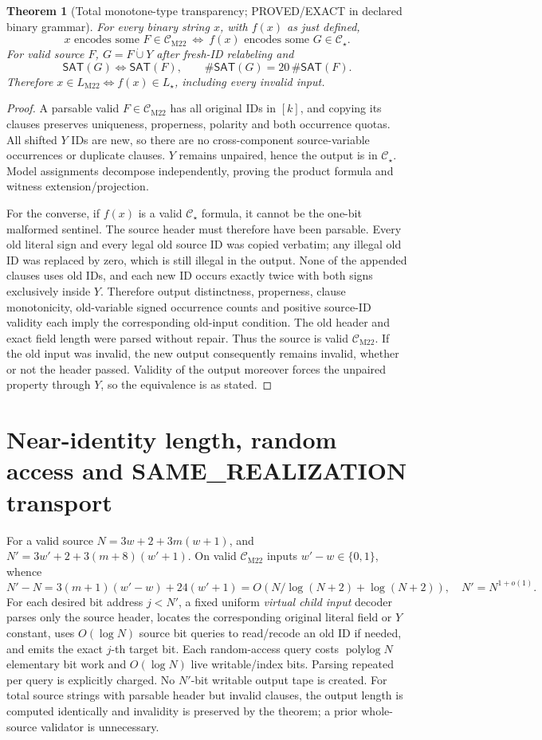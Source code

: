 \documentclass[11pt]{article}
\newtheorem{theorem}{Theorem}
\newcommand{\CM}{\mathcal C_{\mathrm{M22}}}
\newcommand{\CS}{\mathcal C_\star}
\newcommand{\LM}{L_{\mathrm{M22}}}
\newcommand{\LS}{L_\star}
\newcommand{\SAT}{\mathsf{SAT}}
\begin{document}
\begin{theorem}[Total monotone-type transparency; PROVED/EXACT in declared binary grammar]
For every binary string \(x\), with \(f(x)\) as just defined,
\[
\boxed{\quad x\text{ encodes some }F\in\CM\ \Longleftrightarrow\ f(x)\text{ encodes some }G\in\CS.\quad}
\]
For valid source \(F\), \(G=F\dot\cup Y\) after fresh-ID relabeling and
\[
\boxed{\SAT(G)\Longleftrightarrow\SAT(F),\qquad \#\SAT(G)=20\,\#\SAT(F).}
\]
Therefore \(x\in\LM\iff f(x)\in\LS\), including every invalid input.
\end{theorem}
\begin{proof}
A parsable valid \(F\in\CM\) has all original IDs in \([k]\), and copying its clauses preserves uniqueness, properness, polarity and both occurrence quotas. All shifted \(Y\) IDs are new, so there are no cross-component source-variable occurrences or duplicate clauses. \(Y\) remains unpaired, hence the output is in \(\CS\). Model assignments decompose independently, proving the product formula and witness extension/projection.

For the converse, if \(f(x)\) is a valid \(\CS\) formula, it cannot be the one-bit malformed sentinel. The source header must therefore have been parsable. Every old literal sign and every legal old source ID was copied verbatim; any illegal old ID was replaced by zero, which is still illegal in the output. None of the appended clauses uses old IDs, and each new ID occurs exactly twice with both signs exclusively inside \(Y\). Therefore output distinctness, properness, clause monotonicity, old-variable signed occurrence counts and positive source-ID validity each imply the corresponding old-input condition. The old header and exact field length were parsed without repair. Thus the source is valid \(\CM\). If the old input was invalid, the new output consequently remains invalid, whether or not the header passed. Validity of the output moreover forces the unpaired property through \(Y\), so the equivalence is as stated.
\end{proof}

\section{Near-identity length, random access and SAME\_REALIZATION transport}
For a valid source \(N=3w+2+3m(w+1)\), and \(N'=3w'+2+3(m+8)(w'+1)\). On valid \(\CM\) inputs \(w'-w\in\{0,1\}\), whence
\[
\boxed{N'-N=3(m+1)(w'-w)+24(w'+1)=O(N/\log(N+2)+\log(N+2)),\quad N'=N^{1+o(1)}.}
\]
For each desired bit address \(j<N'\), a fixed uniform \emph{virtual child input} decoder parses only the source header, locates the corresponding original literal field or \(Y\) constant, uses \(O(\log N)\) source bit queries to read/recode an old ID if needed, and emits the exact \(j\)-th target bit. Each random-access query costs \(\operatorname{polylog}N\) elementary bit work and \(O(\log N)\) live writable/index bits. Parsing repeated per query is explicitly charged. No \(N'\)-bit writable output tape is created. For total source strings with parsable header but invalid clauses, the output length is computed identically and invalidity is preserved by the theorem; a prior whole-source validator is unnecessary.
\end{document}
